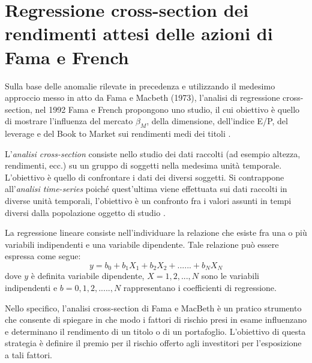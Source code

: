\section{Regressione cross-section dei rendimenti attesi delle azioni di Fama e French} \label{secdue}

Sulla base delle anomalie rilevate in precedenza e utilizzando il medesimo approccio messo in atto da Fama e Macbeth (1973), l'analisi di regressione cross-section, nel 1992 Fama e French propongono uno studio, il cui obiettivo è quello di mostrare l'influenza del mercato $\beta_M$, della dimensione, dell'indice E/P, del leverage e del Book to Market sui rendimenti medi dei titoli \cite{fama_cross-section_1992}. 

L'\textit{analisi cross-section} consiste nello studio dei dati raccolti (ad esempio altezza, rendimenti, ecc.) su un gruppo di soggetti nella medesima unità temporale. L'obiettivo è quello di confrontare i dati dei diversi soggetti. Si contrappone all'\textit{analisi time-series} poiché quest'ultima viene effettuata sui dati raccolti in diverse unità temporali, l'obiettivo è un confronto fra i valori assunti in tempi diversi dalla popolazione oggetto di studio \cite{noauthor_time_2019}. 

La regressione lineare consiste nell'individuare la relazione che esiste fra una o più variabili indipendenti e una variabile dipendente. Tale relazione può essere espressa come segue: 
\begin{equation}
y=b_0+b_1X_1+b_2X_2+......+b_NX_N
\end{equation}
dove $y$ è definita variabile dipendente, $X=1,2,...,N$ sono le variabili indipendenti e $b= 0,1,2,.....,N$ rappresentano i coefficienti di regressione. 


Nello specifico, l'analisi cross-section di Fama e MacBeth è un pratico strumento che consente di spiegare in che modo i fattori di rischio presi in esame influenzano e determinano il rendimento di un titolo o di un portafoglio. L'obiettivo di questa strategia è definire il premio per il rischio offerto agli investitori per l'esposizione a tali fattori. 

